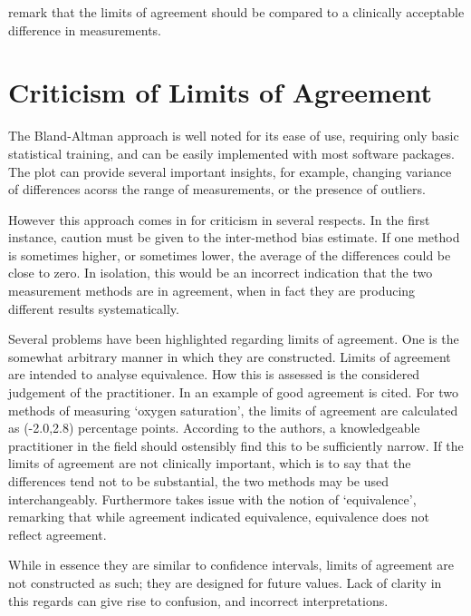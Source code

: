 \documentclass[12pt, a4paper]{report}
\theoremstyle{plain}
\theoremstyle{definition}
\theoremstyle{remark}
\begin{document}
\citet{Dewitte} remark that the limits of agreement should be
compared to a clinically acceptable difference in measurements.

\section{Criticism of Limits of Agreement}
The Bland-Altman approach is well noted for its ease of use, requiring only basic statistical training, and can be easily implemented with most software packages. The plot can provide several important insights, for example, changing variance of differences acorss the range of measurements, or the presence of outliers.


However this approach comes in for criticism in several respects. In the first instance, caution must be given to the inter-method bias estimate.
If one method is sometimes higher, or sometimes lower, the average of the differences could be close to zero. In isolation, this would be an incorrect indication that the two measurement methods are in agreement, when in fact they are producing different results systematically.

Several problems have been highlighted regarding limits of agreement. One is the somewhat arbitrary manner in which they are constructed. Limits of agreement are intended to analyse equivalence. How this is assessed is the considered judgement of the practitioner. In \citet{BA86} an example of good agreement is cited. For two methods of measuring `oxygen saturation', the limits of agreement are calculated as (-2.0,2.8) percentage points. According to the authors, a knowledgeable practitioner in the field should ostensibly find this to be sufficiently narrow. If the limits of agreement are not clinically important, which is to say that the differences tend not to be substantial, the two methods may be used interchangeably. Furthermore \citet{DunnSEME} takes issue with the notion of `equivalence', remarking that while agreement
indicated equivalence, equivalence does not reflect agreement.


While in essence they are similar to confidence intervals, limits of agreement are not constructed as such; they are designed for future values. Lack of clarity in this regards can give rise to confusion, and incorrect interpretations.
\end{document}
